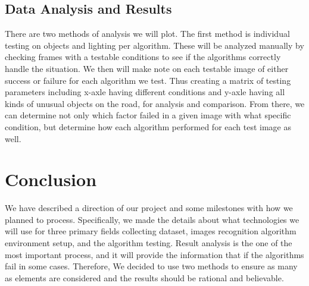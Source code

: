 \documentclass[10pt,draftclsnofoot,onecolumn,journal,compsoc]{IEEEtran}
\begin{document}
\subsection{Data Analysis and Results}
There are two methods of analysis we will plot. 
The first method is individual testing on objects and lighting per algorithm. 
These will be analyzed manually by checking frames with a testable conditions to see if the algorithms correctly handle the situation.
We then will make note on each testable image of either success or failure for each algorithm we test.
Thus creating a matrix of testing parameters including x-axle having different conditions and y-axle having all kinds of unusual objects on the road, for analysis and comparison.
From there, we can determine not only which factor failed in a given image with what specific condition, but determine how each algorithm performed for each test image as well. 

\section{Conclusion}
We have described a direction of our project and some milestones with how we planned to process. Specifically, we made the details about what technologies we will use for three primary fields collecting dataset, images recognition algorithm environment setup, and the algorithm testing. Result analysis is the one of the most important process, and it will provide the information that if the algorithms fail in some cases. Therefore, We decided to use two methods to ensure as many as elements are considered and the results should be rational and believable. 
      
      
\end{document}
